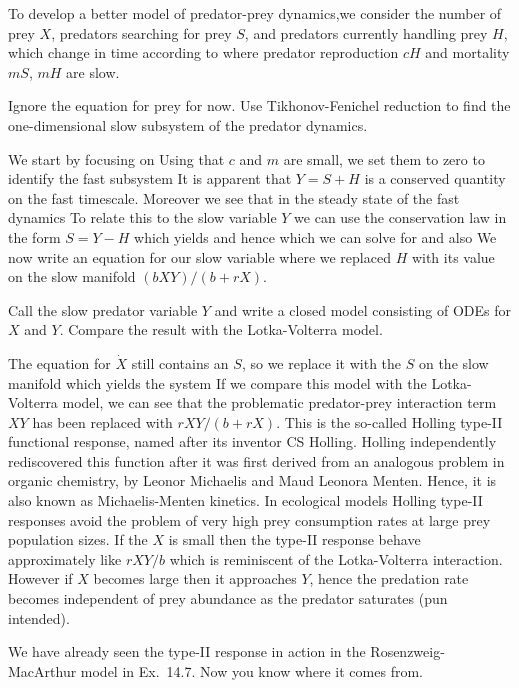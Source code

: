 
To develop a better model of predator-prey dynamics,we consider the number of prey $X$, predators searching for prey $S$, and predators currently handling prey $H$, which change in time according to
where predator reproduction $cH$ and mortality $mS$, $mH$ are slow.

\subquestion Ignore the equation for prey for now. Use Tikhonov-Fenichel reduction to find the one-dimensional slow subsystem of the predator dynamics. 

\solution
We start by focusing on 
Using that $c$ and $m$ are small, we set them to zero to identify the fast subsystem 
It is apparent that $Y=S+H$ is a conserved quantity on the fast timescale. Moreover we see that in the steady state of the fast dynamics 
To relate this to the slow variable $Y$ we can use the conservation law in the form $S=Y-H$ which yields 
and hence 
which we can solve for 
and also
We now write an equation for our slow variable 
where we replaced $H$ with its value on the slow manifold $(bXY)/(b+rX)$. 

\subquestion
Call the slow predator variable $Y$ and write a closed model consisting of ODEs for $X$ and $Y$. Compare the result with the Lotka-Volterra model. 

\solution 
The equation for $\dot{X}$ still contains an $S$, so we replace it with the $S$ on the slow manifold 
which yields the system 
If we compare this model with the Lotka-Volterra model,
we can see that the problematic predator-prey interaction term $XY$ has been replaced with $rXY/(b+rX)$. This is the so-called Holling type-II functional response, named after its inventor CS Holling. Holling independently rediscovered this function after it was first derived from an analogous problem in organic chemistry, by Leonor Michaelis and Maud Leonora Menten. Hence, it is also known as Michaelis-Menten kinetics. In ecological models Holling type-II responses avoid the problem of very high prey consumption rates at large prey population sizes. If the $X$ is small then the type-II response behave approximately like $rXY/b$ which is reminiscent of the Lotka-Volterra interaction. However if $X$ becomes large then it approaches $Y$, hence the predation rate becomes independent of prey abundance as the predator saturates (pun intended).     

We have already seen the type-II response in action in the Rosenzweig-MacArthur model in Ex.~14.7. Now you know where it comes from. 
